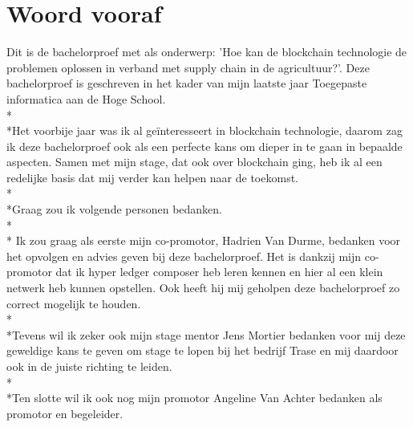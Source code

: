 
\chapter*{Woord vooraf}
\label{ch:voorwoord}

Dit is de bachelorproef met als onderwerp: 'Hoe kan de blockchain technologie de problemen oplossen in verband met supply chain in de agricultuur?'. Deze bachelorproef is geschreven in het kader van mijn laatste jaar Toegepaste informatica aan de Hoge School.\\*\\*Het voorbije jaar was ik al geïnteresseert in blockchain technologie, daarom zag ik deze bachelorproef ook als een perfecte kans om dieper in te gaan in bepaalde aspecten. Samen met mijn stage, dat ook over blockchain ging, heb ik al een redelijke basis dat mij verder kan helpen naar de toekomst.\\*\\*Graag zou ik volgende personen bedanken.\\*\\*
Ik zou graag als eerste mijn co-promotor, Hadrien Van Durme, bedanken voor het opvolgen en advies geven bij deze bachelorproef. Het is dankzij mijn co-promotor dat ik hyper ledger composer heb leren kennen en hier al een klein netwerk heb kunnen opstellen. Ook heeft hij mij geholpen deze bachelorproef zo correct mogelijk te houden.\\*\\*Tevens wil ik zeker ook mijn stage mentor Jens Mortier bedanken voor mij deze geweldige kans te geven om stage te lopen bij het bedrijf Trase en mij daardoor ook in de juiste richting te leiden.\\*\\*Ten slotte wil ik ook nog mijn promotor Angeline Van Achter bedanken als promotor en begeleider.
